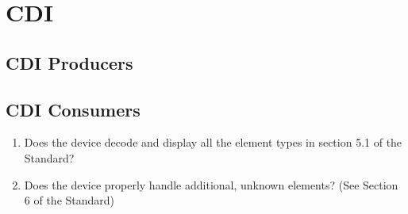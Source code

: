 \section{CDI}
\subsection{CDI Producers}

\subsection{CDI Consumers}
\begin{enumerate}
    \item Does the device decode and display all the element types in section 
            5.1 of the Standard?
    \item Does the device properly handle additional, unknown elements? 
            (See Section 6 of the Standard)
\end{enumerate}

  
